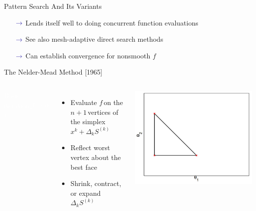\documentclass[handout,aspectratio=54]{beamer}
\numberwithin{theorem}{section}
\begin{document}
\begin{frame}{Pattern Search And Its Variants}
\begin{itemize}\scriptsize
\item[$\textcolor{blue}{\rightarrow }$] Lends itself well to doing concurrent function evaluations
\item[$\textcolor{blue}{\rightarrow }$] See also mesh-adaptive direct search methods
\item[$\textcolor{blue}{\rightarrow }$] Can establish convergence for nonsmooth $f$
\end{itemize}

\tiny
{}

\end{frame}

\begin{frame}{The Nelder-Mead Method [1965]}
\begin{columns}
\colorbox[rgb]{0.5,0.6,0.7}{\textcolor{white}{Basic iteration($k\ge0$):}}
\begin{itemize}\footnotesize
\item Evaluate $f$\,on the $n+1$\,vertices of the simplex\,$x^k+\Delta_kS^{(k)}$
\item Reflect worst vertex about the best face
\item Shrink, contract, or expand\,$\Delta_kS^{(k)}$
\end{itemize}

\includegraphics[width=\textwidth]{fig/18-1.jpg}
\end{columns}

\vspace{2.4cm}
\end{frame}
\end{document}
